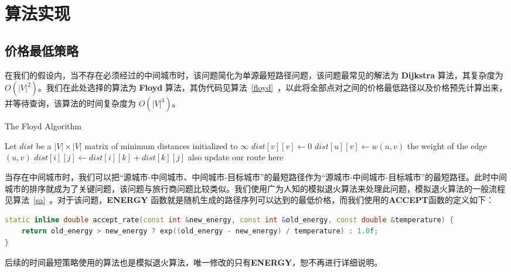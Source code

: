 \documentclass[lang=cn,blue]{elegantbook}
\begin{document}
\chapter{算法实现}

\section{价格最低策略}

在我们的假设内，当不存在必须经过的中间城市时，该问题简化为单源最短路径问题，该问题最常见的解法为 \textbf{Dijkstra} 算法，其复杂度为 $O(|V|^2)$。我们在此处选择的算法为 \textbf{Floyd} 算法，其伪代码见算法~\ref{floyd}~，以此将全部点对之间的价格最低路径以及价格预先计算出来，并等待查询，该算法的时间复杂度为 $O(|V|^3)$。

\begin{algorithm}[H]
	\caption{\label{floyd}The Floyd Algorithm}
	\begin{algorithmic}[1]
		\State Let $dist$ be a $|V| \times |V|$ matrix of minimum distances initialized to $\infty$
		\State $dist[v][v]\gets 0$
		\EndFor
		\State $dist[u][v]\gets w(u,v)$ \Comment the weight of the edge $(u,v)$
		\EndFor
		\State $dist[i][j] \gets dist[i][k] + dist[k][j]$
		\Comment also update our route here
		\EndIf
		\EndFor
		\EndFor
		\EndFor
		\EndProcedure
	\end{algorithmic}
\end{algorithm}

当存在中间城市时，我们可以把``源城市-中间城市、中间城市-目标城市''的最短路径作为``源城市-中间城市-目标城市''的最短路径。此时中间城市的排序就成为了关键问题，该问题与旅行商问题比较类似。我们使用广为人知的模拟退火算法来处理此问题，模拟退火算法的一般流程见算法~\ref{sa}~。对于该问题，\textbf{ENERGY} 函数就是随机生成的路径序列可以达到的最低价格，而我们使用的\textbf{ACCEPT}函数的定义如下：
\begin{lstlisting}[language=C++]
static inline double accept_rate(const int &new_energy, const int &old_energy, const double &temperature) {
	return old_energy > new_energy ? exp((old_energy - new_energy) / temperature) : 1.0f;
}
\end{lstlisting}
后续的时间最短策略使用的算法也是模拟退火算法，唯一修改的只有\textbf{ENERGY}，恕不再进行详细说明。
\end{document}
